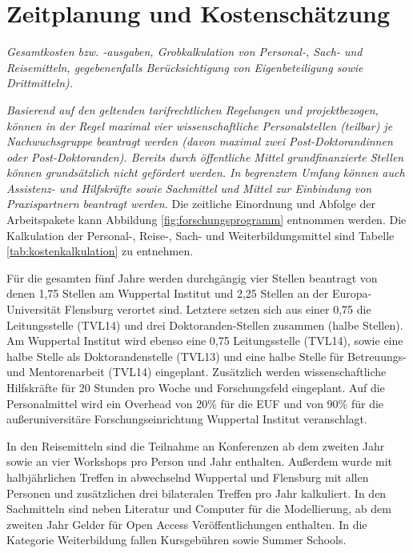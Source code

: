 \documentclass[a4paper,11pt,twoside]{scrartcl}
\begin{document}
\section{Zeitplanung und Kostenschätzung}
\textit{Gesamtkosten bzw. -ausgaben, Grobkalkulation von Personal-, Sach- und Reisemitteln, gegebenenfalls Berücksichtigung von Eigenbeteiligung sowie Drittmitteln).}

\textit{Basierend auf den geltenden tarifrechtlichen Regelungen und projektbezogen, können in der Regel maximal vier wissenschaftliche Personalstellen (teilbar) je Nachwuchsgruppe beantragt werden (davon maximal zwei Post-Doktorandinnen oder Post-Doktoranden). Bereits durch öffentliche Mittel grundfinanzierte Stellen können grundsätzlich nicht gefördert werden.
In begrenztem Umfang können auch Assistenz- und Hilfskräfte sowie Sachmittel und Mittel zur Einbindung von Praxispartnern beantragt werden.}
Die zeitliche Einordnung und Abfolge der Arbeitspakete kann Abbildung \ref{fig:forschungsprogramm} entnommen werden. Die Kalkulation der Personal-, Reise-, Sach- und Weiterbildungsmittel sind Tabelle \ref{tab:kostenkalkulation} zu entnehmen.

Für die gesamten fünf Jahre werden durchgängig vier Stellen beantragt von denen 1,75 Stellen am Wuppertal Institut und 2,25 Stellen an der Europa-Universität Flensburg verortet sind. Letztere setzen sich aus einer 0,75 die Leitungsstelle (TVL14) und drei Doktoranden-Stellen zusammen (halbe Stellen). Am Wuppertal Institut wird ebenso eine 0,75 Leitungsstelle (TVL14), sowie eine halbe Stelle als Doktorandenstelle (TVL13) und eine halbe Stelle für Betreuungs- und Mentorenarbeit (TVL14) eingeplant. Zusätzlich werden wissenschaftliche Hilfskräfte für 20 Stunden pro Woche und Forschungsfeld eingeplant. Auf die Personalmittel wird ein Overhead von 20\% für die EUF und von 90\% für die außeruniversitäre Forschungseinrichtung Wuppertal Institut veranschlagt.

In den Reisemitteln sind die Teilnahme an Konferenzen ab dem zweiten Jahr sowie an vier Workshops pro Person und Jahr enthalten. Außerdem wurde mit halbjährlichen Treffen in abwechselnd Wuppertal und Flensburg mit allen Personen und zusätzlichen drei bilateralen Treffen pro Jahr kalkuliert. In den Sachmitteln sind neben Literatur und Computer für die Modellierung, ab dem zweiten Jahr Gelder für Open Access Veröffentlichungen enthalten. In die Kategorie Weiterbildung fallen Kursgebühren sowie Summer Schools.
\end{document}
